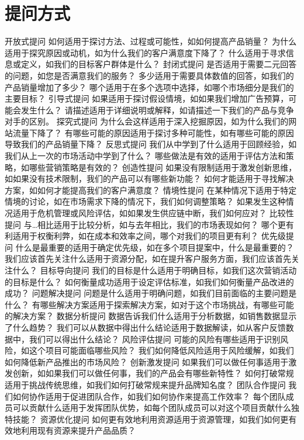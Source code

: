\documentclass[12pt]{book}
\begin{document}
\section{提问方式}
开放式提问
如何适用于探讨方法、过程或可能性，如如何提高产品销量？
为什么适用于探究原因或动机，如为什么我们的客户满意度下降了？
什么适用于寻求信息或定义，如我们的目标客户群体是什么？
封闭式提问
是否适用于需要二元回答的问题，如您是否满意我们的服务？
多少适用于需要具体数值的回答，如我们的产品销量增加了多少？
哪个适用于在多个选项中选择，如哪个市场细分是我们的主要目标？
引导式提问
如果适用于探讨假设情境，如如果我们增加广告预算，可能会发生什么？
请描述适用于详细说明或解释，如请描述一下我们的产品与竞争对手的区别。
探究式提问
为什么会这样适用于深入挖掘原因，如为什么我们的网站流量下降了？
有哪些可能的原因适用于探讨多种可能性，如有哪些可能的原因导致我们的产品销量下降？
反思式提问
我们从中学到了什么适用于回顾经验，如我们从上一次的市场活动中学到了什么？
哪些做法是有效的适用于评估方法和策略，如哪些营销策略是有效的？
创造性提问
如果没有限制适用于激发创新思维，如如果没有技术限制，我们的产品可以有哪些新功能？
如何才能适用于寻找解决方案，如如何才能提高我们的客户满意度？
情境性提问
在某种情况下适用于特定情境的讨论，如在市场需求下降的情况下，我们如何调整策略？
如果发生这种情况适用于危机管理或风险评估，如如果发生供应链中断，我们如何应对？
比较性提问
与…相比适用于比较分析，如与去年相比，我们的市场表现如何？
哪个更有利适用于权衡利弊，如在成本和效率之间，哪个对我们的项目更有利？
优先级提问
什么是最重要的适用于确定优先级，如在多个项目提案中，什么是最重要的？
我们应该首先关注什么适用于资源分配，如在提升客户服务方面，我们应该首先关注什么？
目标导向提问
我们的目标是什么适用于明确目标，如我们这次营销活动的目标是什么？
如何衡量成功适用于设定评估标准，如我们如何衡量产品改进的成功？
问题解决提问
问题是什么适用于明确问题，如我们目前面临的主要问题是什么？
有哪些解决方案适用于探索解决方案，如对于这个市场挑战，有哪些可能的解决方案？
数据分析提问
数据告诉我们什么适用于分析数据，如销售数据显示了什么趋势？
我们可以从数据中得出什么结论适用于数据解读，如从客户反馈数据中，我们可以得出什么结论？
风险评估提问
可能的风险有哪些适用于识别风险，如这个项目可能面临哪些风险？
我们如何降低风险适用于风险缓解，如我们如何降低新产品推出的市场风险？
创新激发提问
如果我们可以做任何事适用于激发创新，如如果我们可以做任何事，我们的产品会有哪些新特性？
如何打破常规适用于挑战传统思维，如我们如何打破常规来提升品牌知名度？
团队合作提问
我们如何协作适用于促进团队合作，如我们如何协作来提高工作效率？
每个团队成员可以贡献什么适用于发挥团队优势，如每个团队成员可以对这个项目贡献什么独特技能？
资源优化提问
如何更有效地利用资源适用于资源管理，如我们如何更有效地利用现有资源来提升产品品质？
\end{document}
